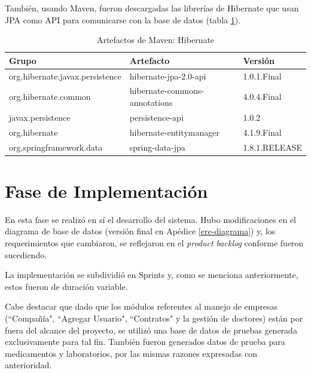     También, usando Maven, fueron descargadas las librerías de Hibernate que usan JPA como API para comunicarse con la base de datos (tabla \ref{artefactos-hibernate}).
    
    \begin{table}[h!]
        
        \begin{center}
            \begin{tabular}{|l|l|l|}\hline
                Grupo & Artefacto & Versión \\\hline
                org.hibernate.javax.persistence & hibernate-jpa-2.0-api & 1.0.1.Final \\\hline
                org.hibernate.common & hibernate-commons-annotations & 4.0.4.Final \\\hline
                javax.persistence & persistence-api & 1.0.2 \\\hline
                org.hibernate & hibernate-entitymanager & 4.1.9.Final \\\hline
                org.springframework.data & spring-data-jpa & 1.8.1.RELEASE \\\hline
            \end{tabular}
        \end{center}
        
        \caption{Artefactos de Maven: Hibernate}
        \label{artefactos-hibernate}
    \end{table}
    
\section{Fase de Implementación} 

En esta fase se realizó en sí el desarrollo del sistema. Hubo modificaciones en el diagrama de base de datos (versión final en Apédice \ref{ere-diagrama}) y, los requerimientos que cambiaron, se reflejaron en el \textit{product backlog} conforme fueron sucediendo.

La implementación se subdividió en Sprints y, como se menciona anteriormente, estos fueron de duración variable.

Cabe destacar que dado que los módulos referentes al manejo de empresas (``Compañía", ``Agregar Usuario", ``Contratos" y la gestión de doctores) están por fuera del alcance del proyecto, se utilizó una base de datos de pruebas generada exclusivamente para tal fin. También fueron generados datos de prueba para medicamentos y laboratorios, por las mismas razones expresadas con anterioridad.

